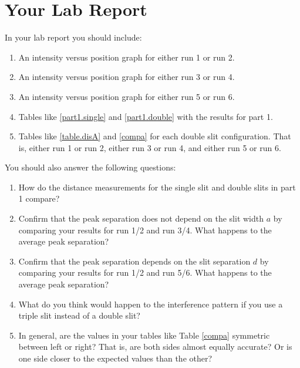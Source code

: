 \section{Your Lab Report}
In your lab report you should include:
\begin{enumerate}
	\item An intensity versus position graph for either run 1 or run 2.
	\item An intensity versus position graph for either run 3 or run 4.
	\item An intensity versus position graph for either run 5 or run 6.
	\item Tables like \ref{part1.single} and \ref{part1.double} with the results for part 1.
	\item Tables like \ref{table.disA} and \ref{compa} for each double slit configuration. That is, either run 1 or run 2, either run 3 or run 4, and either run 5 or run 6. 
\end{enumerate}
You should also answer the following questions:
\begin{enumerate}
	\item How do the distance measurements for the single slit and double slits in part 1 compare?
	\item Confirm that the peak separation does not depend on the slit width $a$ by comparing your results for run 1/2 and run 3/4. What happens to the average peak separation?
	\item Confirm that the peak separation depends on the slit separation $d$ by comparing your results for run 1/2 and run 5/6. What happens to the average peak separation?
	\item What do you think would happen to the interference pattern if you use a triple slit instead of a double slit?
	\item In general, are the values in your tables like Table \ref{compa} symmetric between left or right? That is, are both sides almost equally accurate? Or is one side closer to the expected values than the other?
\end{enumerate}
\newpage
